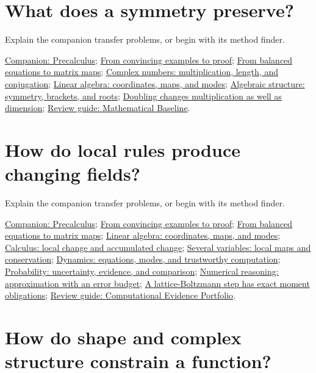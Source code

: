 
\section*{What does a symmetry preserve?}

Explain the companion transfer problems, or begin with its method finder.

\href{https://github.com/Oichkatzelesfrettschen/precalc_paper}{Companion: Precalculus}; \hyperref[learn:proof]{From convincing examples to proof}; \hyperref[learn:matrix_maps]{From balanced equations to matrix maps}; \hyperref[learn:complex_numbers]{Complex numbers: multiplication, length, and conjugation}; \hyperref[learn:linear_algebra]{Linear algebra: coordinates, maps, and modes}; \hyperref[learn:algebra]{Algebraic structure: symmetry, brackets, and roots}; \hyperref[learn:hypercomplex]{Doubling changes multiplication as well as dimension}; \href{https://github.com/Oichkatzelesfrettschen/MathScienceCompendium/blob/main/docs/learning/lessons/review_algebra.md}{Review guide: Mathematical Baseline}.

\section*{How do local rules produce changing fields?}

Explain the companion transfer problems, or begin with its method finder.

\href{https://github.com/Oichkatzelesfrettschen/precalc_paper}{Companion: Precalculus}; \hyperref[learn:proof]{From convincing examples to proof}; \hyperref[learn:matrix_maps]{From balanced equations to matrix maps}; \hyperref[learn:linear_algebra]{Linear algebra: coordinates, maps, and modes}; \hyperref[learn:calculus]{Calculus: local change and accumulated change}; \hyperref[learn:multivariable]{Several variables: local maps and conservation}; \hyperref[learn:dynamics]{Dynamics: equations, modes, and trustworthy computation}; \hyperref[learn:probability]{Probability: uncertainty, evidence, and comparison}; \hyperref[learn:numerical]{Numerical reasoning: approximation with an error budget}; \hyperref[learn:fluids]{A lattice-Boltzmann step has exact moment obligations}; \href{https://github.com/Oichkatzelesfrettschen/MathScienceCompendium/blob/main/docs/learning/lessons/review_computation.md}{Review guide: Computational Evidence Portfolio}.

\section*{How do shape and complex structure constrain a function?}

